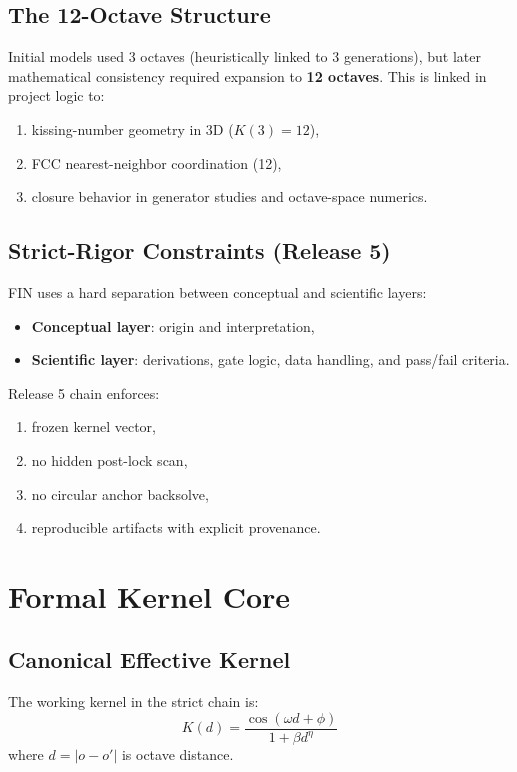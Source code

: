 \documentclass[11pt,a4paper]{article}
\newcommand{\Kd}{K(d)}
\begin{document}
\subsection{The 12-Octave Structure}
Initial models used 3 octaves (heuristically linked to 3 generations), but later mathematical consistency required expansion to \textbf{12 octaves}. This is linked in project logic to:
\begin{enumerate}[leftmargin=1.4em]
    \item kissing-number geometry in 3D ($K(3)=12$),
    \item FCC nearest-neighbor coordination (12),
    \item closure behavior in generator studies and octave-space numerics.
\end{enumerate}

\subsection{Strict-Rigor Constraints (Release 5)}
FIN uses a hard separation between conceptual and scientific layers:
\begin{itemize}[leftmargin=1.4em]
    \item \textbf{Conceptual layer}: origin and interpretation,
    \item \textbf{Scientific layer}: derivations, gate logic, data handling, and pass/fail criteria.
\end{itemize}

Release 5 chain enforces:
\begin{enumerate}[leftmargin=1.4em]
    \item frozen kernel vector,
    \item no hidden post-lock scan,
    \item no circular anchor backsolve,
    \item reproducible artifacts with explicit provenance.
\end{enumerate}

\section{Formal Kernel Core}
\subsection{Canonical Effective Kernel}
The working kernel in the strict chain is:
\begin{equation}
\boxed{\Kd = \frac{\cos(\omega d + \phi)}{1 + \beta d^{\eta}}}
\label{eq:kernel}
\end{equation}
where $d=|o-o'|$ is octave distance.
\end{document}
